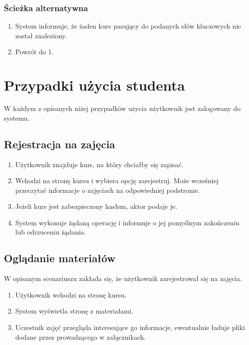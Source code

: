 \documentclass{pracamgr}
\begin{document}
\subsubsection{Ścieżka alternatywna}

\begin{enumerate}
   \item System informuje, że żaden kurs pasujący do podanych słów kluczowych 
      nie został znaleziony.
   \item Powrót do 1.
\end{enumerate}

\section{Przypadki użycia studenta}

W każdym z opisanych niżej przypadków użycia użytkownik jest zalogowany do
systemu.

\subsection{Rejestracja na zajęcia}

\begin{enumerate}
   \item Użytkownik znajduje kurs, na który chciałby się zapisać.
   \item Wchodzi na stronę kursu i wybiera opcję zarejestruj. Może wcześniej
      przeczytać informacje o zajęciach na odpowiedniej podstronie.
   \item Jeżeli kurs jest zabezpieczony hasłem, aktor podaje je.
   \item System wykonuje żądaną operację i informuje o jej pomyślnym zakończeniu
      lub odrzuceniu żądania.
\end{enumerate} 

\subsection{Oglądanie materiałów}

W opisanym scenariuszu zakłada się, że użytkownik zarejestrował się na zajęcia.

\begin{enumerate}
   \item Użytkownik wchodzi na stronę kursu.
   \item System wyświetla stronę z materiałami.
   \item Uczestnik zajęć przegląda interesujące go informacje,
      ewentualnie ładuje pliki dodane przez prowadzącego
      w załącznikach.
      
\end{enumerate} 
\end{document}
